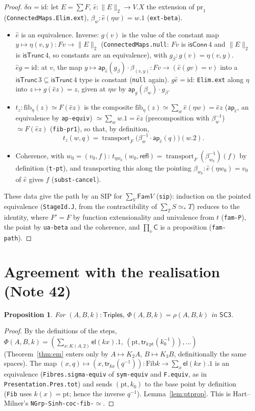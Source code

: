 \documentclass[11pt]{amsart}
\newtheorem{proposition}[theorem]{Proposition}
\theoremstyle{definition}
\theoremstyle{remark}
\newcommand{\code}[1]{\texttt{#1}}
\newcommand{\cT}{\mathsf{isTrunc}}
\newcommand{\cC}{\mathsf{isConn}}
\newcommand{\refl}{\mathsf{refl}}
\newcommand{\ap}{\mathsf{ap}}
\newcommand{\el}{\mathsf{el}}
\newcommand{\Fib}{\mathrm{Fib}}
\newcommand{\fib}{\mathrm{fib}}
\newcommand{\tr}[1]{\|#1\|}
\newcommand{\SC}{\mathsf{SC3}}
\newcommand{\Tri}{\mathsf{Triples}}
\newcommand{\Fam}{\mathsf{Fam}}
\newcommand{\pteq}{\simeq_*}
\begin{document}
\begin{proof}
$\delta\alpha=\mathrm{id}$: let $E=\sum F$, $\hat e:\tr E_2\to V.X$ the extension of
$\mathrm{pr}_1$ (\code{ConnectedMaps.Elim.ext}), $\beta_w:\hat e(\eta w)=w.1$ (\code{ext-beta}).
\begin{itemize}
\item $\hat e$ is an equivalence. Inverse: $g(v)$ is the value of the constant map
$y\mapsto\eta(v,y):Fv\to\tr E_2$ (\code{ConnectedMaps.null}: $Fv$ is $\cC\,4$ and $\tr E_2$ is
$\cT\,4$, so constants are an equivalence), with $g_\beta:g(v)=\eta(v,y)$. $\hat e g=\mathrm{id}$:
at $v$, the map $y\mapsto\ap_{\hat e}(g_\beta)\cdot\beta_{(v,y)}:Fv\to(\hat e(gv)=v)$ into a
$\cT\,3\subseteq\cT\,4$ type is constant (\code{null} again). $g\hat e=\mathrm{id}$:
\code{Elim.ext} along $\eta$ into $z\mapsto g(\hat ez)=z$, given at $\eta w$ by
$\ap_g(\beta_w)\cdot g_\beta$.
\item $t_z:\fib_\eta(z)\simeq F(\hat e z)$ is the composite
$\fib_\eta(z)\simeq\sum_{w}\hat e(\eta w)=\hat ez$ ($\ap_{\hat e}$, an equivalence by
\code{ap-equiv}) $\simeq\sum_w w.1=\hat ez$ (precomposition with $\beta_w^{-1}$)
$\simeq F(\hat ez)$ (\code{fib-pr1}), so that, by definition,
\[t_z(w,q)=\operatorname{transport}_F\bigl(\beta_w^{-1}\cdot\ap_{\hat e}(q)\bigr)(w.2).\]
\item Coherence, with $w_0=(v_0,f)$: $t_{\eta w_0}(w_0,\refl)=\operatorname{transport}_F(\beta_{w_0}^{-1})(f)$
by definition (\code{t-pt}), and transporting this along the pointing $\beta_{w_0}:\hat e(\eta w_0)=v_0$
of $\hat e$ gives $f$ (\code{subst-cancel}).
\end{itemize}
These data give the path by an SIP for $\sum_{V}\Fam V$ (\code{sip}): induction on the pointed
equivalence (\code{StageId.J}, from the contractibility of $\sum_T S\pteq T$) reduces to the
identity, where $F'=F$ by function extensionality and univalence from $t$ (\code{fam-P}), the
point by \code{ua-beta} and the coherence, and $\prod_v\mathsf C$ is a proposition (\code{fam-path}).
\end{proof}

\section{Agreement with the realisation (Note 42)}

\begin{proposition}\label{prop:real}
For $(A,B,k):\Tri$, $\Phi(A,B,k)=\rho(A,B,k)$ in $\SC$.
\end{proposition}
\begin{proof} By the definitions of the steps, $\Phi(A,B,k)=(\sum_{x:K(A,2)}\el(kx).1,\ (\mathrm{pt},\mathsf{tr}_{k\,\mathrm{pt}}(k_0^{-1})),\ldots)$
(Theorem~\ref{thm:em} enters only by $A\mapsto K_2A$, $B\mapsto K_3B$, definitionally the same
spaces). The map $(x,q)\mapsto(x,\mathsf{tr}_{kx}(q^{-1})):\Fib k\to\sum_x\el(kx).1$ is an
equivalence (\code{Fibres.sigma-equiv} of \code{sym-equiv} and \code{F.equiv}, as in
\code{Presentation.Pres.tot}) and sends $(\mathrm{pt},k_0)$ to the base point by definition
(\code{Fib} uses $k(x)=\mathrm{pt}$; hence the inverse $q^{-1}$). Lemma~\ref{lem:ptprop}. This is Hart--Milner's
\code{NGrp-Sinh-coc-fib-\ensuremath{\simeq}}. \end{proof}
\end{document}

